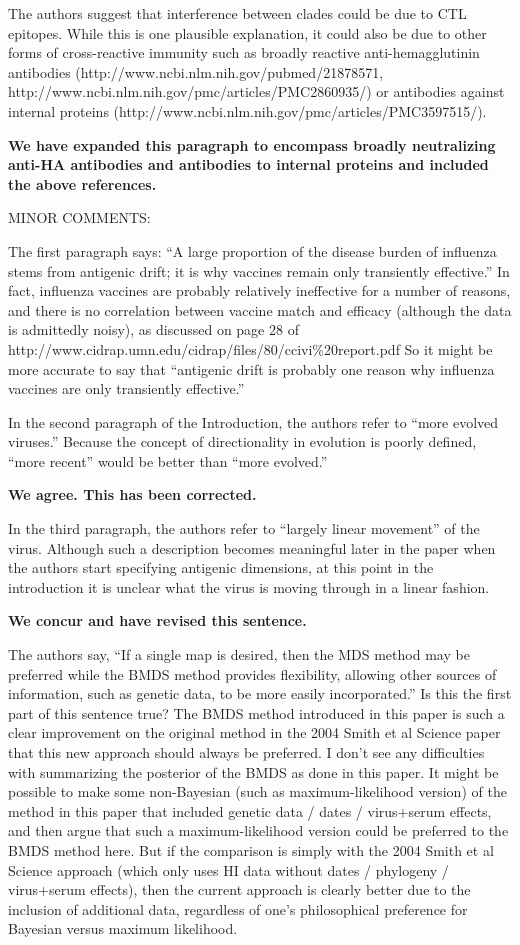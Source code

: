\documentclass[11pt,oneside,letterpaper]{article}
\begin{document}
The authors suggest that interference between clades could be due to CTL epitopes. While this is one plausible explanation, it could also be due to other forms of cross-reactive immunity such as broadly reactive anti-hemagglutinin antibodies (http://www.ncbi.nlm.nih.gov/pubmed/21878571, http://www.ncbi.nlm.nih.gov/pmc/articles/PMC2860935/) or antibodies against internal proteins (http://www.ncbi.nlm.nih.gov/pmc/articles/PMC3597515/).

\textbf{We have expanded this paragraph to encompass broadly neutralizing anti-HA antibodies and antibodies to internal proteins and included the above references.}

MINOR COMMENTS: 

The first paragraph says: ``A large proportion of the disease burden of influenza stems from antigenic drift; it is why vaccines remain only transiently effective.'' In fact, influenza vaccines are probably relatively ineffective for a number of reasons, and there is no correlation between vaccine match and efficacy (although the data is admittedly noisy), as discussed on page 28 of http://www.cidrap.umn.edu/cidrap/files/80/ccivi\%20report.pdf So it might be more accurate to say that ``antigenic drift is probably one reason why influenza vaccines are only transiently effective.''

In the second paragraph of the Introduction, the authors refer to ``more evolved viruses.'' Because the concept of directionality in evolution is poorly defined, ``more recent'' would be better than ``more evolved.''

\textbf{We agree. This has been corrected.}

In the third paragraph, the authors refer to ``largely linear movement'' of the virus. Although such a description becomes meaningful later in the paper when the authors start specifying antigenic dimensions, at this point in the introduction it is unclear what the virus is moving through in a linear fashion.

\textbf{We concur and have revised this sentence.}

The authors say, ``If a single map is desired, then the MDS method may be preferred while the BMDS method provides flexibility, allowing other sources of information, such as genetic data, to be more easily incorporated.'' Is this the first part of this sentence true? The BMDS method introduced in this paper is such a clear improvement on the original method in the 2004 Smith et al Science paper that this new approach should always be preferred. I don't see any difficulties with summarizing the posterior of the BMDS as done in this paper. It might be possible to make some non-Bayesian (such as maximum-likelihood version) of the method in this paper that included genetic data / dates / virus+serum effects, and then argue that such a maximum-likelihood version could be preferred to the BMDS method here. But if the comparison is simply with the 2004 Smith et al Science approach (which only uses HI data without dates / phylogeny / virus+serum effects), then the current approach is clearly better due to the inclusion of additional data, regardless of one's philosophical preference for Bayesian versus maximum likelihood.
\end{document}
